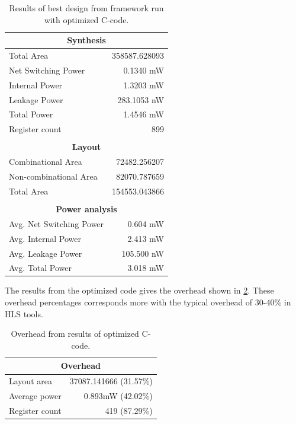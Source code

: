 \begin{table}[hbtp]
    \centering
    \begin{tabular}{lr}
    \multicolumn{2}{c}{\textbf{Synthesis}} \\
    \toprule
    Total Area & 358587.628093 \\
    \hline
    Net Switching Power & 0.1340 mW \\
    Internal Power & 1.3203 mW \\
    Leakage Power & 283.1053 nW \\
    \hline
    Total Power & 1.4546 mW \\
    \hline
    Register count & 899 \\ 
    \bottomrule
    & \\
    \multicolumn{2}{c}{\textbf{Layout}} \\
    \toprule
    Combinational Area & 72482.256207 \\
    Non-combinational Area & 82070.787659 \\
    \hline
    Total Area & 154553.043866 \\
    \bottomrule
    & \\
    \multicolumn{2}{c}{\textbf{Power analysis}} \\
    \toprule
    Avg. Net Switching Power & 0.604 mW \\
    Avg. Internal Power & 2.413 mW \\
    Avg. Leakage Power & 105.500 nW \\
    \hline
    Avg. Total Power & 3.018 mW \\
    \bottomrule
    \end{tabular}
    \caption{Results of best design from framework run with optimized C-code.}
    \label{tab:resultsframeworkrun3}
\end{table}
The results from the optimized code gives the overhead shown in \cref{tab:overheadframeworkrun3}. These overhead percentages corresponds more with the typical overhead of 30-40\% in HLS tools.
\begin{table}[hbtp]
    \centering
    \begin{tabular}{lr}
    \multicolumn{2}{c}{\textbf{Overhead}} \\
    \toprule
    Layout area & 37087.141666 (31.57\%) \\
    Average power & 0.893mW (42.02\%) \\
    Register count & 419 (87.29\%) \\
    \bottomrule
    \end{tabular}
    \caption{Overhead from results of optimized C-code.}
    \label{tab:overheadframeworkrun3}
\end{table}

